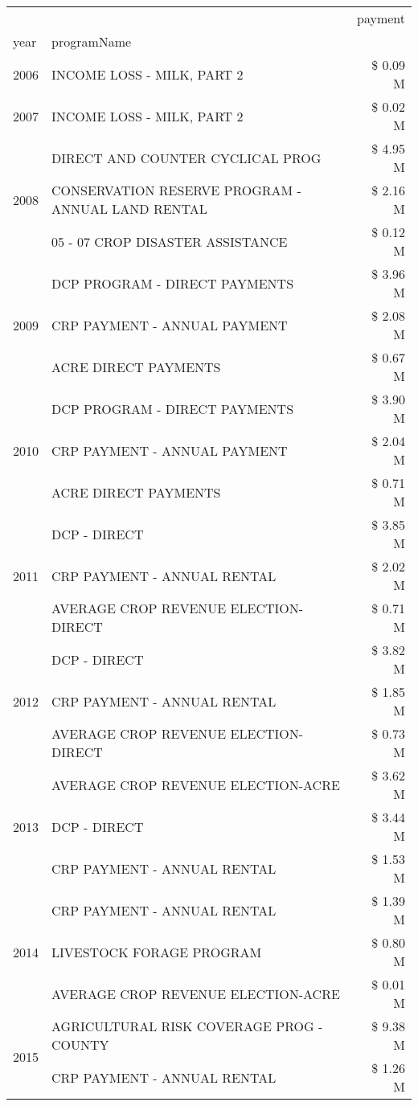 \begin{tabular}{llr}
\toprule
 &  & payment \\
year & programName &  \\
\midrule
2006 & INCOME LOSS - MILK, PART 2 & \$ 0.09 M \\
\cline{1-3}
2007 & INCOME LOSS - MILK, PART 2 & \$ 0.02 M \\
\cline{1-3}
\multirow[t]{3}{*}{2008} & DIRECT AND COUNTER CYCLICAL PROG & \$ 4.95 M \\
 & CONSERVATION RESERVE PROGRAM - ANNUAL LAND RENTAL & \$ 2.16 M \\
 & 05 - 07 CROP DISASTER ASSISTANCE & \$ 0.12 M \\
\cline{1-3}
\multirow[t]{3}{*}{2009} & DCP PROGRAM - DIRECT PAYMENTS & \$ 3.96 M \\
 & CRP PAYMENT - ANNUAL PAYMENT & \$ 2.08 M \\
 & ACRE DIRECT PAYMENTS & \$ 0.67 M \\
\cline{1-3}
\multirow[t]{3}{*}{2010} & DCP PROGRAM - DIRECT PAYMENTS & \$ 3.90 M \\
 & CRP PAYMENT - ANNUAL PAYMENT & \$ 2.04 M \\
 & ACRE DIRECT PAYMENTS & \$ 0.71 M \\
\cline{1-3}
\multirow[t]{3}{*}{2011} & DCP - DIRECT & \$ 3.85 M \\
 & CRP PAYMENT - ANNUAL RENTAL & \$ 2.02 M \\
 & AVERAGE CROP REVENUE ELECTION-DIRECT & \$ 0.71 M \\
\cline{1-3}
\multirow[t]{3}{*}{2012} & DCP - DIRECT & \$ 3.82 M \\
 & CRP PAYMENT - ANNUAL RENTAL & \$ 1.85 M \\
 & AVERAGE CROP REVENUE ELECTION-DIRECT & \$ 0.73 M \\
\cline{1-3}
\multirow[t]{3}{*}{2013} & AVERAGE CROP REVENUE ELECTION-ACRE & \$ 3.62 M \\
 & DCP - DIRECT & \$ 3.44 M \\
 & CRP PAYMENT - ANNUAL RENTAL & \$ 1.53 M \\
\cline{1-3}
\multirow[t]{3}{*}{2014} & CRP PAYMENT - ANNUAL RENTAL & \$ 1.39 M \\
 & LIVESTOCK FORAGE PROGRAM & \$ 0.80 M \\
 & AVERAGE CROP REVENUE ELECTION-ACRE & \$ 0.01 M \\
\cline{1-3}
\multirow[t]{3}{*}{2015} & AGRICULTURAL RISK COVERAGE PROG - COUNTY & \$ 9.38 M \\
 & CRP PAYMENT - ANNUAL RENTAL & \$ 1.26 M \\

\end{tabular}
